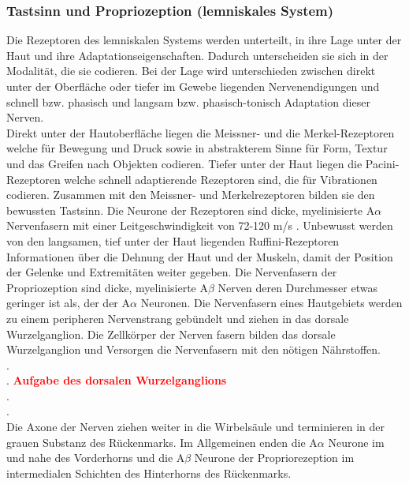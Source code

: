 \documentclass[12pt,a4paper,pdftex]{article}
\begin{document}
\subsubsection{Tastsinn und Propriozeption (lemniskales System)}
Die Rezeptoren des lemniskalen Systems werden unterteilt, in ihre Lage unter der Haut und ihre Adaptationseigenschaften. Dadurch unterscheiden sie sich in der Modalität, die sie codieren. Bei der Lage wird unterschieden zwischen direkt unter der Oberfläche oder tiefer im Gewebe liegenden Nervenendigungen und schnell bzw. phasisch und langsam bzw. phasisch-tonisch Adaptation dieser Nerven.\\
Direkt unter der Hautoberfläche liegen die Meissner- und die Merkel-Rezeptoren welche für Bewegung und Druck sowie in abstrakterem Sinne für Form, Textur und das Greifen nach Objekten codieren. \cite[Kap. 24]{paxinos2014rat} Tiefer unter der Haut liegen die Pacini-Rezeptoren welche schnell adaptierende Rezeptoren sind, die für Vibrationen codieren. Zusammen mit den Meissner- und Merkelrezeptoren bilden sie den bewussten Tastsinn. Die Neurone der Rezeptoren sind dicke, myelinisierte A$\alpha$ Nervenfasern mit einer Leitgeschwindigkeit von 72-120 m/s \cite[Kap.22]{kandel2013principles}. Unbewusst werden von den langsamen, tief unter der Haut liegenden Ruffini-Rezeptoren Informationen über die Dehnung der Haut und der Muskeln, damit der Position der Gelenke und Extremitäten weiter gegeben.
Die Nervenfasern der Propriozeption sind dicke, myelinisierte A$\beta$ Nerven deren Durchmesser etwas geringer ist als, der der A$\alpha$ Neuronen.
Die Nervenfasern eines Hautgebiets werden zu einem peripheren Nervenstrang gebündelt und ziehen in das dorsale Wurzelganglion. Die Zellkörper der Nerven fasern bilden das dorsale Wurzelganglion und Versorgen die Nervenfasern mit den nötigen Nährstoffen. 
\\.\\. \textcolor{red}{\textbf{Aufgabe des dorsalen Wurzelganglions}}
\\.\\.\\
Die Axone der Nerven ziehen weiter in die Wirbelsäule und terminieren in der grauen Substanz des Rückenmarks. Im Allgemeinen enden die A$\alpha$ Neurone im und nahe des Vorderhorns und die A$\beta$ Neurone der Propriorezeption im intermedialen Schichten des Hinterhorns des Rückenmarks.
\end{document}
